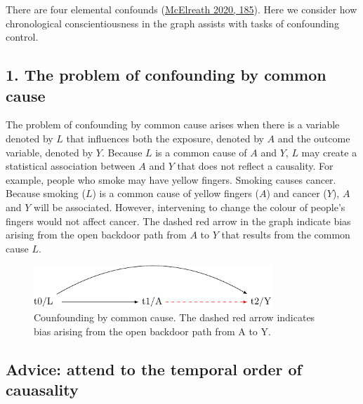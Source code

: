 \documentclass[
  singlecolumn]{report}
\begin{document}
There are four elemental confounds
(\protect\hyperlink{ref-mcelreath2020}{McElreath 2020, 185}). Here we
consider how chronological conscientiousness in the graph assists with
tasks of confounding control.

\hypertarget{the-problem-of-confounding-by-common-cause}{%
\subsection{1. The problem of confounding by common
cause}\label{the-problem-of-confounding-by-common-cause}}

The problem of confounding by common cause arises when there is a
variable denoted by \(L\) that influences both the exposure, denoted by
\(A\) and the outcome variable, denoted by \(Y.\) Because \(L\) is a
common cause of \(A\) and \(Y\), \(L\) may create a statistical
association between \(A\) and \(Y\) that does not reflect a causality.
For example, people who smoke may have yellow fingers. Smoking causes
cancer. Because smoking (\(L\)) is a common cause of yellow fingers
(\(A\)) and cancer (\(Y\)), \(A\) and \(Y\) will be associated. However,
intervening to change the colour of people's fingers would not affect
cancer. The dashed red arrow in the graph indicate bias arising from the
open backdoor path from \(A\) to \(Y\) that results from the common
cause \(L\).

\begin{figure}

{\centering \includegraphics[width=0.8\textwidth,height=\textheight]{causal-dags_files/figure-pdf/fig-dag-common-cause-1.pdf}

}

\caption{\label{fig-dag-common-cause}Counfounding by common cause. The
dashed red arrow indicates bias arising from the open backdoor path from
A to Y.}

\end{figure}

\hypertarget{advice-attend-to-the-temporal-order-of-cauasality}{%
\subsection{Advice: attend to the temporal order of
cauasality}\label{advice-attend-to-the-temporal-order-of-cauasality}}
\end{document}
